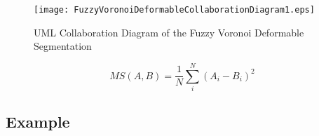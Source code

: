 \begin{figure}
\center
\texttt{[image: FuzzyVoronoiDeformableCollaborationDiagram1.eps]}
\caption{UML Collaboration Diagram of the Fuzzy Voronoi Deformable Segmentation}
\label{fig:FuzzyVoronoiDeformableCollaborationDiagram1}
\end{figure}









%
%


\begin{equation}
MS(A,B) = \frac{1}{N} \sum_i^N \left( A_i - B_i \right)^2
\end{equation}





\subsection{Example}
\label{sec:HybridSegmentationExample1}




